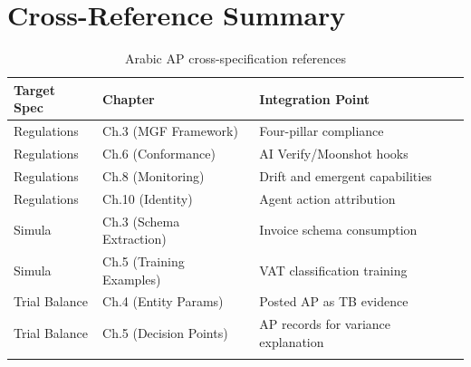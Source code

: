\documentclass[11pt,a4paper,twoside]{report}
\begin{document}
\section{Cross-Reference Summary}
\label{sec:xref-summary}

\begin{longtable}{@{}p{3.5cm}p{4cm}p{5cm}@{}}
\toprule
\textbf{Target Spec} & \textbf{Chapter} & \textbf{Integration Point} \\
\midrule
\endhead
Regulations & Ch.3 (MGF Framework) & Four-pillar compliance \\
Regulations & Ch.6 (Conformance) & AI Verify/Moonshot hooks \\
Regulations & Ch.8 (Monitoring) & Drift and emergent capabilities \\
Regulations & Ch.10 (Identity) & Agent action attribution \\
\midrule
Simula & Ch.3 (Schema Extraction) & Invoice schema consumption \\
Simula & Ch.5 (Training Examples) & VAT classification training \\
\midrule
Trial Balance & Ch.4 (Entity Params) & Posted AP as TB evidence \\
Trial Balance & Ch.5 (Decision Points) & AP records for variance explanation \\
\bottomrule
\caption{Arabic AP cross-specification references}
\end{longtable}
\end{document}
